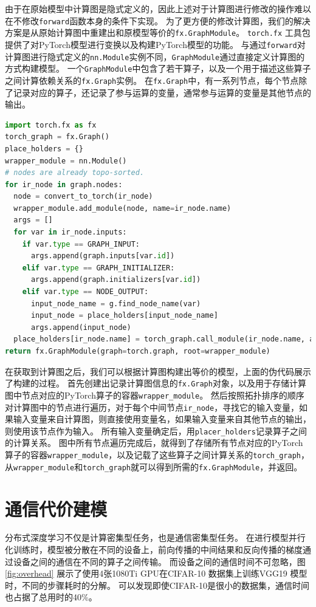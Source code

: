 由于在原始模型中计算图是隐式定义的，因此上述对于计算图进行修改的操作难以在不修改\texttt{forward}函数本身的条件下实现。
为了更方便的修改计算图，我们的解决方案是从原始计算图中重建出和原模型等价的\texttt{fx.GraphModule}。
\texttt{torch.fx}  工具包提供了对PyTorch模型进行变换以及构建PyTorch模型的功能。
与通过\texttt{forward}对计算图进行隐式定义的\texttt{nn.Module}实例不同，\texttt{GraphModule}通过直接定义计算图的方式构建模型。
一个\texttt{GraphModule}中包含了若干算子，以及一个用于描述这些算子之间计算依赖关系的\texttt{fx.Graph}实例。
在\texttt{fx.Graph}中，有一系列节点，每个节点除了记录对应的算子，还记录了参与运算的变量，通常参与运算的变量是其他节点的输出。

\begin{lstlisting}[language=Python, caption={模型重建}]
import torch.fx as fx 
torch_graph = fx.Graph() 
place_holders = {}
wrapper_module = nn.Module()
# nodes are already topo-sorted.
for ir_node in graph.nodes:
  node = convert_to_torch(ir_node)
  wrapper_module.add_module(node, name=ir_node.name)
  args = []
  for var in ir_node.inputs:
    if var.type == GRAPH_INPUT:
	  args.append(graph.inputs[var.id])
	elif var.type == GRAPH_INITIALIZER:
      args.append(graph.initializers[var.id])
	elif var.type == NODE_OUTPUT:
	  input_node_name = g.find_node_name(var)
	  input_node = place_holders[input_node_name]
	  args.append(input_node)
  place_holders[ir_node.name] = torch_graph.call_module(ir_node.name, args)
return fx.GraphModule(graph=torch.graph, root=wrapper_module)
\end{lstlisting}

在获取到计算图之后，我们可以根据计算图构建出等价的模型，上面的伪代码展示了构建的过程。
首先创建出记录计算图信息的\texttt{fx.Graph}对象，以及用于存储计算图中节点对应的PyTorch算子的容器\texttt{wrapper\_module}。
然后按照拓扑排序的顺序对计算图中的节点进行遍历，对于每个中间节点\texttt{ir\_node}，寻找它的输入变量，如果输入变量来自计算图，则直接使用变量名，如果输入变量来自其他节点的输出，则使用该节点作为输入。
所有输入变量确定后，用\texttt{placer\_holders}记录算子之间的计算关系。
图中所有节点遍历完成后，就得到了存储所有节点对应的PyTorch算子的容器\texttt{wrapper\_module}，以及记载了这些算子之间计算关系的\texttt{torch\_graph}，从\texttt{wrapper\_module}和\texttt{torch\_graph}就可以得到所需的\texttt{fx.GraphModule}，并返回。

\section{通信代价建模}
\label{sec:commu}
分布式深度学习不仅是计算密集型任务，也是通信密集型任务。
在进行模型并行化训练时，模型被分散在不同的设备上，前向传播的中间结果和反向传播的梯度通过设备之间的通信在不同的算子之间传输。
而设备之间的通信时间不可忽略，图 \ref{fig:overhead} 展示了使用4张1080Ti GPU在CIFAR-10  数据集上训练VGG19  模型时，不同的步骤耗时的分解。
可以发现即使CIFAR-10是很小的数据集，通信时间也占据了总用时的40\%。

